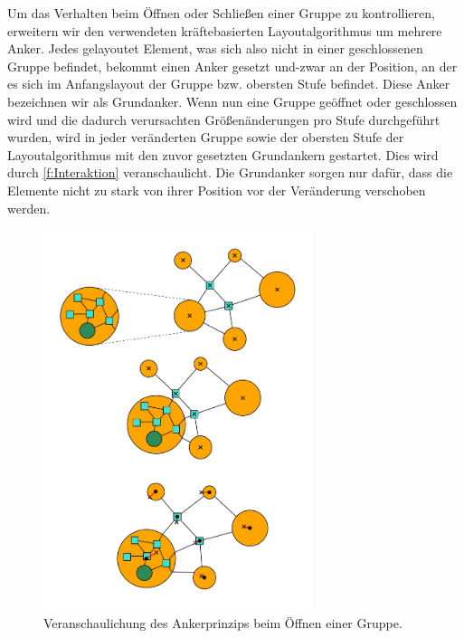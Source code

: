 
Um das Verhalten beim Öffnen oder Schließen einer Gruppe zu kontrollieren, erweitern wir den verwendeten kräftebasierten Layoutalgorithmus um mehrere Anker. 
Jedes gelayoutet Element, was sich also nicht in einer geschlossenen Gruppe befindet, bekommt einen Anker gesetzt und-zwar an der Position, 
an der es sich im Anfangslayout der Gruppe bzw. obersten Stufe befindet. 
Diese Anker bezeichnen wir als Grundanker. 
Wenn nun eine Gruppe geöffnet oder geschlossen wird und die dadurch verursachten Größenänderungen pro Stufe durchgeführt wurden, 
wird in jeder veränderten Gruppe sowie der obersten Stufe der Layoutalgorithmus mit den zuvor gesetzten Grundankern gestartet. 
Dies wird  durch \autoref{f:Interaktion} veranschaulicht. Die Grundanker sorgen nur dafür, dass die Elemente nicht zu stark von ihrer Position vor der Veränderung verschoben werden.

\begin{figure}[h!]
\begin{center} 
  \includegraphics[width=0.7\textwidth]{Pics/Interaktion.pdf}
  \caption{Veranschaulichung des Ankerprinzips beim Öffnen einer Gruppe.}
  \label{f:Interaktion}
\end{center}
\end{figure}


